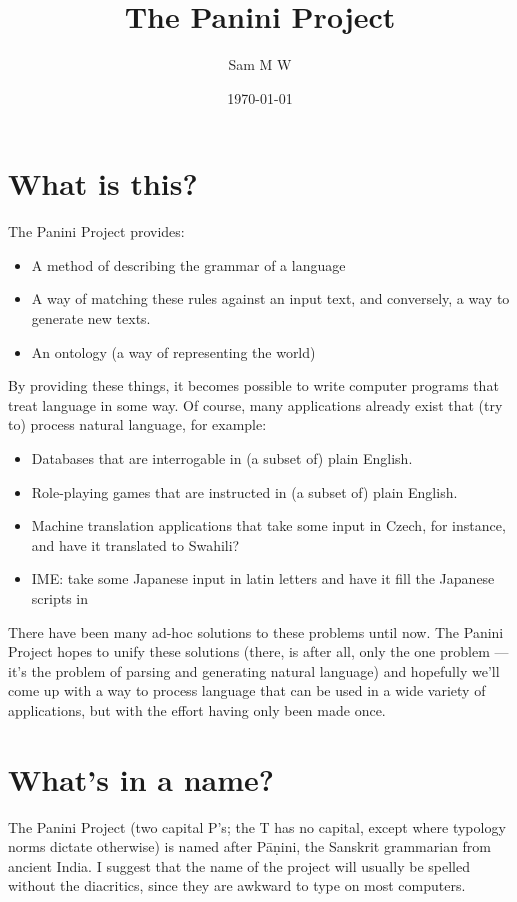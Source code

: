 \documentclass{article}
\title{The Panini Project}
\author{Sam M W}
\date{\today}
\begin{document}
\label{start}

\maketitle

\section{What is this?}

The Panini Project provides:
\begin{itemize}
	\item A method of describing the grammar of a language
	\item A way of matching these rules against an input text, and conversely, a
way to generate new texts.
	\item An ontology (a way of representing the world)
\end{itemize}
By providing these things, it becomes possible to write computer programs that
treat language in some way. Of course, many applications already exist that (try
to) process natural language, for example:
\begin{itemize}
	\item Databases that are interrogable in (a subset of) plain English.
	\item Role-playing games that are instructed in (a subset of) plain English.
	\item Machine translation applications that take some input in Czech, for
instance, and have it translated to Swahili?
	\item IME: take some Japanese input in latin letters and have it fill the
Japanese scripts in
\end{itemize}

There have been many ad-hoc solutions to these problems until now. The Panini
Project hopes to unify these solutions (there, is after all, only the one
problem --- it's the problem of parsing and generating natural language) and
hopefully we'll come up with a way to process language that can be used in a
wide variety of applications, but with the effort having only been made once.

\section{What's in a name?}
The Panini Project (two capital P's; the T has no capital, except where typology
norms dictate otherwise) is named after P\=a\d{n}ini, the Sanskrit grammarian
from ancient India. I suggest that the name of the project will usually be
spelled without the diacritics, since they are awkward to type on most
computers.
\end{document}
